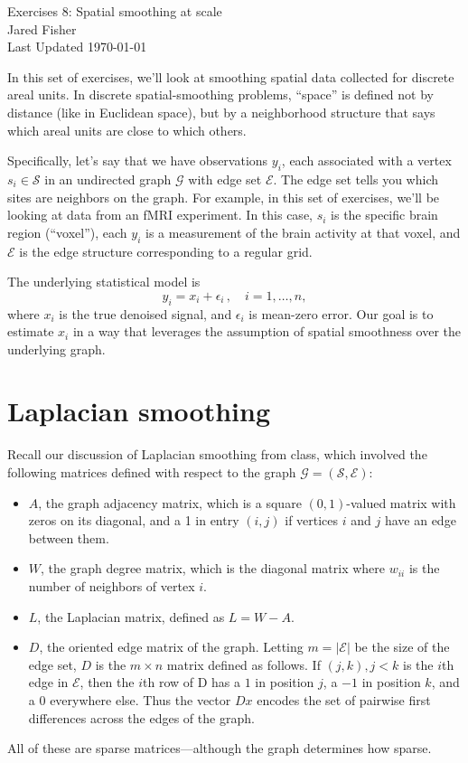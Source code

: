 \documentclass{article}
\begin{document}
\large 
\begin{center}
Exercises 8: Spatial smoothing at scale \\
\vspace{10pt}
Jared Fisher\\
Last Updated \today
\end{center}
\normalsize


\bigskip


In this set of exercises, we'll look at smoothing spatial data collected for discrete areal units.  In discrete spatial-smoothing problems, ``space'' is defined not by distance (like in Euclidean space), but by a neighborhood structure that says which areal units are close to which others.

Specifically, let's say that we have observations $y_i$, each associated with a vertex $s_i \in \mathcal{S}$ in an undirected graph $\mathcal{G}$ with edge set $\mathcal{E}$.  The edge set tells you which sites are neighbors on the graph.  For example, in this set of exercises, we'll be looking at data from an fMRI experiment.  In this case, $s_i$ is the specific brain region (``voxel''), each $y_i$ is a measurement of the brain activity at that voxel, and $\mathcal{E}$ is the edge structure corresponding to a regular grid.

The underlying statistical model is
$$
y_i = x_i + \epsilon_i \, , \quad i = 1, \ldots, n, 
$$
where $x_i$ is the true denoised signal, and $\epsilon_i$ is mean-zero error.  Our goal is to estimate $x_i$ in a way that leverages the assumption of spatial smoothness over the underlying graph.

\section{Laplacian smoothing}

Recall our discussion of Laplacian smoothing from class, which involved the following matrices defined with respect to the graph $\mathcal{G} = (\mathcal{S}, \mathcal{E})$:
\begin{itemize}
\item $A$, the graph adjacency matrix, which is a square $(0,1)$-valued matrix with zeros on its diagonal, and a 1 in entry $(i,j)$ if vertices $i$ and $j$ have an edge between them.
\item $W$, the graph degree matrix, which is the diagonal matrix where $w_{ii}$ is the number of neighbors of vertex $i$.
\item $L$, the Laplacian matrix, defined as $L = W - A$.
\item $D$, the oriented edge matrix of the graph.   Letting $m = |\mathcal{E}|$ be the size of the edge set, $D$ is the $m \times n$ matrix defined as follows.  If $(j,k), j<k$ is the $i$th edge in $\mathcal{E}$, then the $i$th row of D has a $1$ in position $j$, a $-1$ in position $k$, and a $0$ everywhere else.  Thus the vector $D x$ encodes the set of pairwise first differences across the edges of the graph.
\end{itemize}
All of these are sparse matrices---although the graph determines how sparse.
\end{document}
